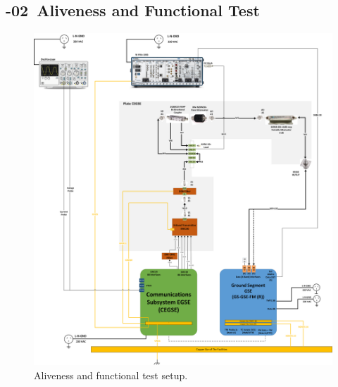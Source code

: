 \setcounter{Sec}{0}\setcounter{Step}{0}

\newpage
\renewcommand{\subprocid}{{\procid}-02}

\newpage
\subsection{\subprocid \ Aliveness and Functional Test}


\begin{figure}[H]
	\centering
	  \includegraphics[width=.9\linewidth]{figuras/EWC30PXISetupB.png}  
	  \caption{Aliveness and functional test setup.}
	\label{fig:setup_xband_funcional}
	\end{figure}
\newpage
